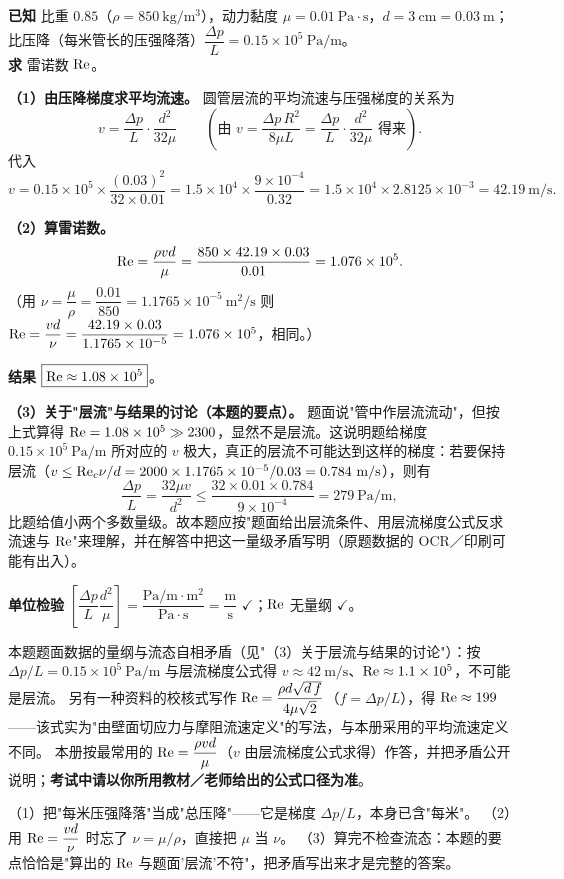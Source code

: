 \begin{jie}
\textbf{已知} 比重 $0.85$（$\rho=850\ \mathrm{kg/m^3}$），动力黏度 $\mu=0.01\ \mathrm{Pa\cdot s}$，$d=3\ \mathrm{cm}=0.03\ \mathrm{m}$；比压降（每米管长的压强降落）$\dfrac{\Delta p}{L}=0.15\times10^5\ \mathrm{Pa/m}$。\\
\textbf{求} 雷诺数 $\mathrm{Re}$。

\textbf{（1）由压降梯度求平均流速。} 圆管层流的平均流速与压强梯度的关系为
\[v=\frac{\Delta p}{L}\cdot\frac{d^2}{32\mu}\qquad\left(\text{由 }v=\frac{\Delta p\,R^2}{8\mu L}=\frac{\Delta p}{L}\cdot\frac{d^2}{32\mu}\text{ 得来}\right).\]
代入
\[v=0.15\times10^5\times\frac{(0.03)^2}{32\times0.01}
=1.5\times10^4\times\frac{9\times10^{-4}}{0.32}=1.5\times10^4\times2.8125\times10^{-3}=42.19\ \mathrm{m/s}.\]

\textbf{（2）算雷诺数。}
\[\mathrm{Re}=\frac{\rho vd}{\mu}=\frac{850\times42.19\times0.03}{0.01}=1.076\times10^5.\]
（用 $\nu=\dfrac{\mu}{\rho}=\dfrac{0.01}{850}=1.1765\times10^{-5}\ \mathrm{m^2/s}$ 则 $\mathrm{Re}=\dfrac{vd}{\nu}=\dfrac{42.19\times0.03}{1.1765\times10^{-5}}=1.076\times10^5$，相同。）

\textbf{结果} $\boxed{\mathrm{Re}\approx1.08\times10^5}$。

\textbf{（3）关于"层流"与结果的讨论（本题的要点）。} 题面说"管中作层流流动"，但按上式算得 $\mathrm{Re}=1.08\times10^5\gg2300$，显然不是层流。这说明题给梯度 $0.15\times10^5\ \mathrm{Pa/m}$ 所对应的 $v$ 极大，真正的层流不可能达到这样的梯度：若要保持层流（$v\le\Rey_c\nu/d=2000\times1.1765\times10^{-5}/0.03=0.784\ \mathrm{m/s}$），则有
\[\frac{\Delta p}{L}=\frac{32\mu v}{d^2}\le\frac{32\times0.01\times0.784}{9\times10^{-4}}=279\ \mathrm{Pa/m},\]
比题给值小两个多数量级。故本题应按"题面给出层流条件、用层流梯度公式反求流速与 $\mathrm{Re}$"来理解，并在解答中把这一量级矛盾写明（原题数据的 OCR／印刷可能有出入）。

\textbf{单位检验} $\left[\dfrac{\Delta p}{L}\dfrac{d^2}{\mu}\right]=\dfrac{\mathrm{Pa/m}\cdot\mathrm{m^2}}{\mathrm{Pa\cdot s}}=\dfrac{\mathrm{m}}{\mathrm{s}}$ $\checkmark$；$\mathrm{Re}$ 无量纲 $\checkmark$。
\end{jie}
\begin{tishi}
本题题面数据的量纲与流态自相矛盾（见"（3）关于层流与结果的讨论"）：按 $\Delta p/L=0.15\times10^5\ \mathrm{Pa/m}$ 与层流梯度公式得 $v\approx42\ \mathrm{m/s}$、$\mathrm{Re}\approx1.1\times10^5$，不可能是层流。
另有一种资料的校核式写作 $\mathrm{Re}=\dfrac{\rho d\sqrt{d\,f}}{4\mu\sqrt2}$（$f=\Delta p/L$），得 $\mathrm{Re}\approx199$——该式实为"由壁面切应力与摩阻流速定义"的写法，与本册采用的平均流速定义不同。
本册按最常用的 $\mathrm{Re}=\dfrac{\rho vd}{\mu}$（$v$ 由层流梯度公式求得）作答，并把矛盾公开说明；\textbf{考试中请以你所用教材／老师给出的公式口径为准}。
\end{tishi}
\begin{yicuo}
（1）把"每米压强降落"当成"总压降"——它是梯度 $\Delta p/L$，本身已含"每米"。
（2）用 $\mathrm{Re}=\dfrac{vd}{\nu}$ 时忘了 $\nu=\mu/\rho$，直接把 $\mu$ 当 $\nu$。
（3）算完不检查流态：本题的要点恰恰是"算出的 $\mathrm{Re}$ 与题面'层流'不符"，把矛盾写出来才是完整的答案。
\end{yicuo}

